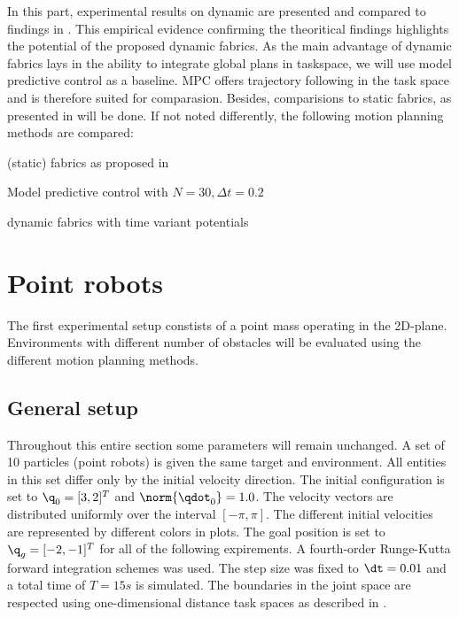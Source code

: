 In this part, experimental results on dynamic are presented and compared to findings in
\cite{Ratliff2020}. This empirical evidence confirming the theoritical findings highlights
the potential of the proposed dynamic fabrics. As the main advantage of dynamic fabrics
lays in the ability to integrate global plans in taskspace, we will use model predictive
control as a baseline. MPC offers trajectory following in the task space and is therefore
suited for comparasion. Besides, comparisions to static fabrics, as presented in
\cite{Ratliff2020} will be done. If not noted differently, the following motion planning
methods are compared:
\begin{compactitem}
  \item (static) fabrics as proposed in \cite{Ratliff2020}
  \item Model predictive control with $N=30, \Delta t=0.2$
  \item dynamic fabrics with time variant potentials
\end{compactitem}

\section{Point robots}%
\label{sec:point_robots}

The first experimental setup constists of a point mass operating in
the 2D-plane. Environments with different number of obstacles will be evaluated using the
different motion planning methods.

\subsection{General setup}%
\label{sub:general_setup}

Throughout this entire section some parameters will remain unchanged. A set of 10
particles (point robots) is given the same target and environment. All entities in this
set differ only by the initial velocity direction. The initial configuration is set to
$\q_0 = [3, 2]^T$ and $\norm{\qdot_0} = 1.0$. The velocity vectors are distributed
uniformly over the interval $[-\pi, \pi]$. The different initial velocities are
represented by different colors in plots. The goal position is set to $\q_{g} = [-2,
-1]^T$ for all of the following expirements. A fourth-order Runge-Kutta forward integration
schemes was used. The step size was fixed to $\dt = 0.01$ and a total time of $T=15s$ is
simulated. The boundaries in the joint space are respected using one-dimensional distance
task spaces as described in \cite{Ratliff2020}.

